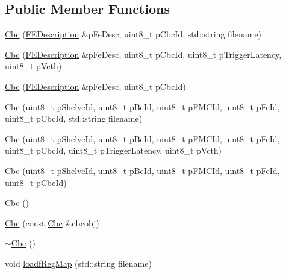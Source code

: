 \subsection*{Public Member Functions}
\begin{DoxyCompactItemize}
\item 
\hyperlink{class_ph2___hw_description_1_1_cbc_a4569a0838d600c2d96f25adb6403e610}{Cbc} (\hyperlink{class_ph2___hw_description_1_1_f_e_description}{F\-E\-Description} \&p\-Fe\-Desc, uint8\-\_\-t p\-Cbc\-Id, std\-::string filename)
\item 
\hyperlink{class_ph2___hw_description_1_1_cbc_a8ad3757886613841f563b6eecd5d8406}{Cbc} (\hyperlink{class_ph2___hw_description_1_1_f_e_description}{F\-E\-Description} \&p\-Fe\-Desc, uint8\-\_\-t p\-Cbc\-Id, uint8\-\_\-t p\-Trigger\-Latency, uint8\-\_\-t p\-Vcth)
\item 
\hyperlink{class_ph2___hw_description_1_1_cbc_ad14c3944426f98d07914d0cb0fd38948}{Cbc} (\hyperlink{class_ph2___hw_description_1_1_f_e_description}{F\-E\-Description} \&p\-Fe\-Desc, uint8\-\_\-t p\-Cbc\-Id)
\item 
\hyperlink{class_ph2___hw_description_1_1_cbc_ad2ec420b5bd8e361a151b585a62c0ebe}{Cbc} (uint8\-\_\-t p\-Shelve\-Id, uint8\-\_\-t p\-Be\-Id, uint8\-\_\-t p\-F\-M\-C\-Id, uint8\-\_\-t p\-Fe\-Id, uint8\-\_\-t p\-Cbc\-Id, std\-::string filename)
\item 
\hyperlink{class_ph2___hw_description_1_1_cbc_a31698ad31b2484c74b87647e9451fc6d}{Cbc} (uint8\-\_\-t p\-Shelve\-Id, uint8\-\_\-t p\-Be\-Id, uint8\-\_\-t p\-F\-M\-C\-Id, uint8\-\_\-t p\-Fe\-Id, uint8\-\_\-t p\-Cbc\-Id, uint8\-\_\-t p\-Trigger\-Latency, uint8\-\_\-t p\-Vcth)
\item 
\hyperlink{class_ph2___hw_description_1_1_cbc_ac7e237f12e6950b45538e3706be11bb0}{Cbc} (uint8\-\_\-t p\-Shelve\-Id, uint8\-\_\-t p\-Be\-Id, uint8\-\_\-t p\-F\-M\-C\-Id, uint8\-\_\-t p\-Fe\-Id, uint8\-\_\-t p\-Cbc\-Id)
\item 
\hyperlink{class_ph2___hw_description_1_1_cbc_a5b7124456823871d611ada17ed0a51a1}{Cbc} ()
\item 
\hyperlink{class_ph2___hw_description_1_1_cbc_ab529cbb8cbbbc3b28a7ca2a472d4aa50}{Cbc} (const \hyperlink{class_ph2___hw_description_1_1_cbc}{Cbc} \&cbcobj)
\item 
\hyperlink{class_ph2___hw_description_1_1_cbc_a4e641d292073978e6e1b34fa91c13067}{$\sim$\-Cbc} ()
\item 
void \hyperlink{class_ph2___hw_description_1_1_cbc_afd6fdbe40eff3c160221a3a8acfb657d}{loadf\-Reg\-Map} (std\-::string filename)

\end{DoxyCompactItemize}
